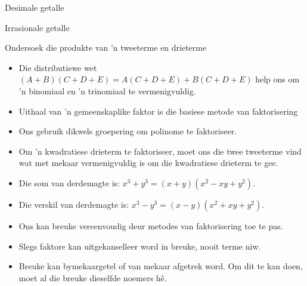 \begin{Aktiwiteit}{Desimale getalle}
\begin{aktiwiteit}{Irrasionale getalle}
\begin{aktiwiteit}{Ondersoek die produkte van 'n tweeterme en drieterme}
\begin{itemize}[itemsep=5pt, label=\textbullet{}]
\item Die distributiewe wet $(A+B)(C+D+E)=A(C+D+E)+B(C+D+E)$ help ons om ’n binomiaal en ’n trinomiaal te vermenigvuldig.
\item Uithaal van 'n gemeenskaplike faktor is die basiese metode van faktorisering
\item Ons gebruik dikwels groepering om polinome te faktoriseer.
\item Om ’n kwadratiese drieterm te faktoriseer, moet ons die twee tweeterme vind wat met mekaar vermenigvuldig is om die kwadratiese drieterm te gee.
\item Die som van derdemagte is: ${x}^{3}+{y}^{3}=(x+y)({x}^{2}-xy+{y}^{2})$. 
\item Die verskil van derdemagte is: ${x}^{3}-{y}^{3}=(x-y)({x}^{2}+xy+{y}^{2})$.
\item Ons kan breuke vereenvoudig deur metodes van faktorisering toe te pas.
\item Slegs faktore kan uitgekanselleer word in breuke, nooit terme niw.
\item Breuke kan bymekaargetel of van mekaar afgetrek word. Om dit te kan doen, moet al die breuke dieselfde
noemers hê.

\end{itemize}


\begin{eocexercises}{}



\end{eocexercises}
\end{aktiwiteit}
\end{aktiwiteit}
\end{Aktiwiteit}
